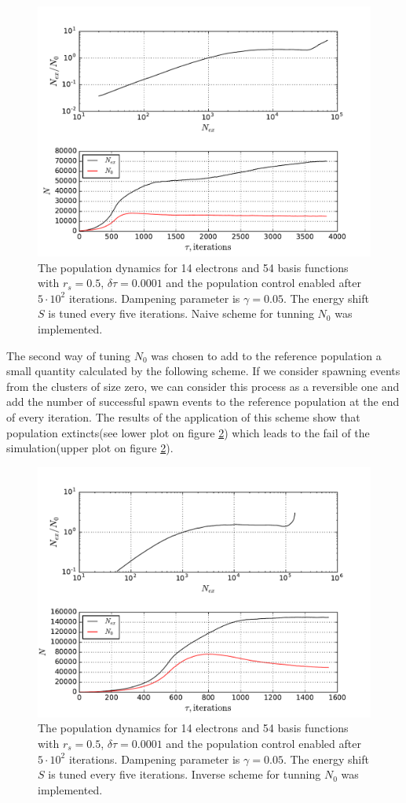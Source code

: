 \documentclass[twoside,english]{uiofysmaster}
\begin{document}
\begin{figure}[ht!]
	\centering
	\includegraphics[width=0.8\linewidth]{N0tunningNaive}
	\caption{The population dynamics for 14 electrons and 54 basis functions with $r_s=0.5$, $\delta \tau=0.0001$ and the population control enabled after $5\cdot 10^2$ iterations. Dampening parameter is $\gamma = 0.05$. The energy shift $S$ is tuned every five iterations. Naive scheme for tunning $N_0$ was implemented.}
	\label{fig:N0tunningNaive}
\end{figure}
The second way of tuning $N_0$ was chosen to add to the reference population a small quantity calculated by the following scheme. If we consider spawning events from the clusters of size zero, we can consider this process as a reversible one and add the number of successful spawn events to the reference population at the end of every iteration. The results of the application of this scheme show that population extincts(see lower plot on figure \ref{fig:N0tunning}) which leads to the fail of the simulation(upper plot on figure \ref{fig:N0tunning}).



\begin{figure}[ht!]
	\centering
	\includegraphics[width=0.8\linewidth]{N0tunning}
	\caption{The population dynamics for 14 electrons and 54 basis functions with $r_s=0.5$, $\delta \tau=0.0001$ and the population control enabled after $5\cdot 10^2$ iterations. Dampening parameter is $\gamma = 0.05$. The energy shift $S$ is tuned every five iterations. Inverse scheme for tunning $N_0$ was implemented.}
	\label{fig:N0tunning}
\end{figure}
\end{document}

